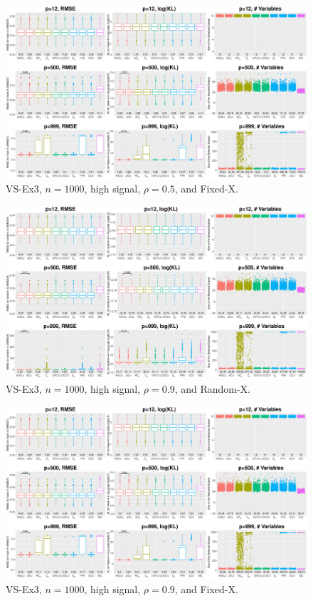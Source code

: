 \begin{figure}[!ht]
\centering
\includegraphics[width=\textwidth]{figures/supplement/fixedx_VS-Ex3_n1000_hsnr_rho05.eps}
\caption{VS-Ex3, $n=1000$, high signal, $\rho=0.5$, and Fixed-X.}
\end{figure}
\clearpage
\begin{figure}[!ht]
\centering
\includegraphics[width=\textwidth]{figures/supplement/randomx_VS-Ex3_n1000_hsnr_rho09.eps}
\caption{VS-Ex3, $n=1000$, high signal, $\rho=0.9$, and Random-X.}
\end{figure}
\begin{figure}[!ht]
\centering
\includegraphics[width=\textwidth]{figures/supplement/fixedx_VS-Ex3_n1000_hsnr_rho09.eps}
\caption{VS-Ex3, $n=1000$, high signal, $\rho=0.9$, and Fixed-X.}
\end{figure}
